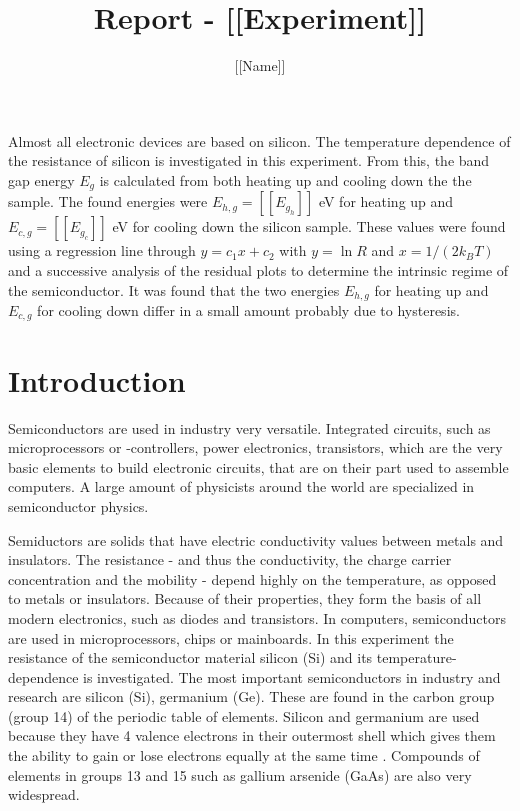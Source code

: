 \documentclass[a4paper]{article}
\author{[[Name]]}
\title{Report - [[Experiment]]}
\begin{document}

\maketitle
\abstract 

Almost all electronic devices are based on silicon. The temperature dependence of the resistance of silicon is investigated in this experiment. From this, the band gap energy $E_g$ is calculated from both heating up and cooling down the the sample. The found energies were $E_{h,g} = [[E_g_h]]$ eV for heating up and $E_{c,g} = [[E_g_c]]$ eV for cooling down the silicon sample. These values were found using a regression line through $y=c_1 x + c_2$ with $y = \ln{R}$ and $x = 1/(2 k_B T)$ and a successive analysis of the residual plots to determine the intrinsic regime of the semiconductor. It was found that the two energies $E_{h,g}$ for heating up and $E_{c,g}$ for cooling down differ in a small amount probably due to hysteresis.

\section{Introduction}
\label{sec:introduction}

Semiconductors are used in industry very versatile. Integrated circuits, such as microprocessors or -controllers, power electronics, transistors, which are the very basic elements to build electronic circuits, that are on their part used to assemble computers. A large amount of physicists around the world are specialized in semiconductor physics.

Semiductors are solids that have electric conductivity values between metals and insulators. The resistance - and thus the conductivity, the charge carrier concentration and the mobility - depend highly on the temperature, as opposed to metals or insulators. Because of their properties, they form the basis of all modern electronics, such as diodes and transistors. In computers, semiconductors are used in microprocessors, chips or mainboards. In this experiment the resistance of the semiconductor material silicon (Si) and its temperature-dependence is investigated. The most important semiconductors in industry and research are silicon (Si), germanium (Ge). These are found in the carbon group (group 14) of the periodic table of elements. Silicon and germanium are used because they have 4 valence electrons in their outermost shell which gives them the ability to gain or lose electrons equally at the same time \cite{yacobi2003}. Compounds of elements in groups 13 and 15 such as gallium arsenide (GaAs) are also very widespread.
\end{document}
